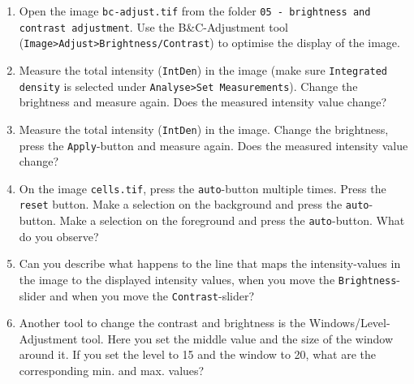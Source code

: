 \begin{enumerate}

\item Open the image \texttt{bc-adjust.tif} from the folder \texttt{05 - brightness and contrast adjustment}. Use the B\&C-Adjustment tool (\texttt{Image>Adjust>Brightness/Contrast}) to optimise the display of the image.

\item Measure the total intensity (\texttt{IntDen}) in the image (make sure \texttt{Integrated density} is selected under \texttt{Analyse>Set Measurements}). Change the brightness and measure again. Does the
measured intensity value change?

\fbox{
	\begin{minipage}{\linewidth}
		\hfill\vspace{1cm}
	\end{minipage}
	}
	
\item Measure the total intensity (\texttt{IntDen}) in the image. Change the brightness, press the \texttt{Apply}-button and measure again. Does the measured intensity value change?

\fbox{
	\begin{minipage}{\linewidth}
		\hfill\vspace{1cm}
	\end{minipage}
	}
	
\item On the image \texttt{cells.tif}, press the \texttt{auto}-button multiple times. Press the \texttt{reset} button. Make a selection on the background and press the \texttt{auto}-button. Make a selection on the foreground and press the \texttt{auto}-button. What do you observe?

\fbox{
	\begin{minipage}{\linewidth}
		\hfill\vspace{2cm}
	\end{minipage}
	}
	
\item Can you describe what happens to the line that maps the intensity-values in the image to the
displayed intensity values, when you move the \texttt{Brightness}-slider and when you move the \texttt{Contrast}-slider?

\fbox{
	\begin{minipage}{\linewidth}
		\hfill\vspace{2cm}
	\end{minipage}
	}

\item Another tool to change the contrast and brightness is the Windows/Level-Adjustment tool. Here you set the middle value and the size of the window around it. If you set the level to 15 and the window to 20, what are the corresponding min. and max. values?	

\fbox{
	\begin{minipage}{\linewidth}
		\hfill\vspace{1cm}
	\end{minipage}
	}
	
\end{enumerate}


